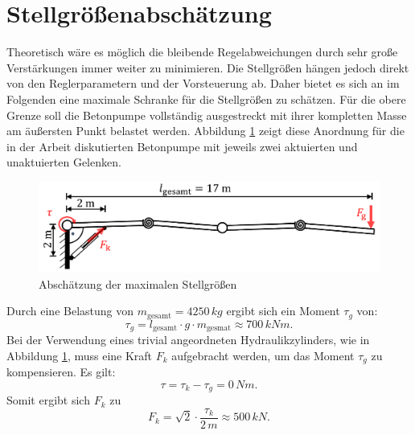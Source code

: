 \section{Stellgrößenabschätzung}
Theoretisch wäre es möglich die bleibende Regelabweichungen durch sehr große Verstärkungen immer weiter zu minimieren. Die Stellgrößen hängen jedoch direkt von den Reglerparametern und der Vorsteuerung ab. Daher bietet es sich an im Folgenden eine maximale Schranke für die Stellgrößen zu schätzen. \newline
Für die obere Grenze soll die Betonpumpe vollständig ausgestreckt mit ihrer kompletten Masse am äußersten Punkt belastet werden. Abbildung \ref{fig:Stellgroessenabschaetzung} zeigt diese Anordnung für die in der Arbeit diskutierten Betonpumpe mit jeweils zwei aktuierten und unaktuierten Gelenken.   
\newline
	\begin{figure}[h!]
		\centering
		\includegraphics[scale=0.6]{Bilder/Stelgroessenabschaetzung.pdf}
		\caption{Abschätzung der maximalen Stellgrößen}
		\label{fig:Stellgroessenabschaetzung}
	\end{figure}\newline
Durch eine Belastung von $m_{\mathrm{gesamt}} = 4250\,\si{kg}$ ergibt sich ein Moment $\tau_g$ von:
	\begin{equation}
		\tau_g = l_{\mathrm{gesamt}}\cdot g\cdot m_{\mathrm{gesmat}}\approx 700 \,\si{kNm}.
	\end{equation}  
Bei der Verwendung eines trivial angeordneten Hydraulikzylinders, wie in Abbildung \ref{fig:Stellgroessenabschaetzung}, muss eine Kraft $F_k$ aufgebracht werden, um das Moment $\tau_g$ zu kompensieren.  Es gilt:
	\begin{equation}
		\tau = \tau_k-\tau_g = 0 \,\si{Nm}.
	\end{equation}
Somit ergibt sich $F_k$ zu
	\begin{equation}
		F_k = \sqrt{2}\cdot \frac{\tau_k}{2\,\si{m}} \approx 500\,\si{kN}.
	\end{equation}

